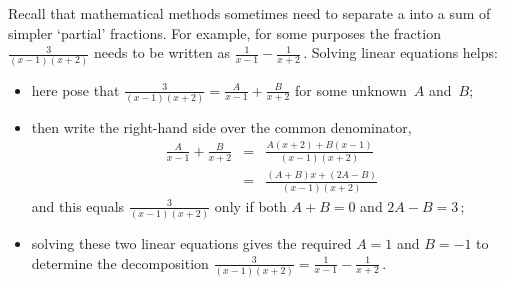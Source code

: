 \begin{example} \label{eg:}
Recall that mathematical methods sometimes need to separate a  into a sum of simpler `partial' fractions.  
For example, for some purposes the fraction \(\frac3{(x-1)(x+2)}\) needs to be written as \(\frac1{x-1}-\frac1{x+2}\)\,.  
Solving linear equations helps: \begin{itemize}
\item here  pose that \(\frac3{(x-1)(x+2)} = \frac A{x-1}+\frac B{x+2}\) for some unknown~\(A\) and~\(B\); 
\item then write the right-hand side over the common denominator,
\begin{eqnarray*}
\frac A{x-1}+\frac B{x+2}
&=&\frac{A(x+2)+B(x-1)}{(x-1)(x+2)}
\\&=&\frac{(A+B)x+(2A-B)}{(x-1)(x+2)}
\end{eqnarray*}
and this equals \(\frac3{(x-1)(x+2)}\) only if both \(A+B=0\) and \(2A-B=3\)\,; 
\item solving these two linear equations gives the required \(A=1\) and \(B=-1\) to determine the decomposition \(\frac3{(x-1)(x+2)}=\frac1{x-1}-\frac1{x+2}\)\,.
\end{itemize}



\end{example}
